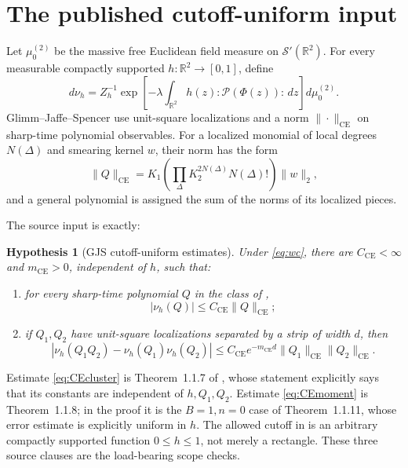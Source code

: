 \documentclass[11pt,a4paper]{article}
\newtheorem{hypothesis}[theorem]{Hypothesis}
\theoremstyle{remark}
\newcommand{\R}{\mathbb R}
\newcommand{\CE}{\mathrm{CE}}
\begin{document}
\section{The published cutoff-uniform input}

Let $\mu_0^{(2)}$ be the massive free Euclidean field measure on $\mathcal S'(\R^2)$.
For every measurable compactly supported $h:\R^2\to[0,1]$, define
\[
 d\nu_h=Z_h^{-1}\exp\left[-\lambda\int_{\R^2}
 h(z):\mathscr P(\Phi(z)):\,dz\right]d\mu_0^{(2)}.
\]
Glimm--Jaffe--Spencer use unit-square localizations and a norm
$\|\cdot\|_{\CE}$ on sharp-time polynomial observables.  For a localized monomial of local
degrees $N(\Delta)$ and smearing kernel $w$, their norm has the form
\begin{equation}\label{eq:CEnorm}
 \|Q\|_{\CE}=K_1
 \left(\prod_\Delta K_2^{2N(\Delta)}N(\Delta)!\right)\|w\|_2,       \tag{2.1}
\end{equation}
and a general polynomial is assigned the sum of the norms of its localized pieces.

The source input is exactly:

\begin{hypothesis}[GJS cutoff-uniform estimates]\label{hyp:CE}
Under \eqref{eq:wc}, there are $C_{\CE}<\infty$ and $m_{\CE}>0$, independent of
$h$, such that:
\begin{enumerate}
\item for every sharp-time polynomial $Q$ in the class of
\cite[(1.1.5)--(1.1.9)]{GJS},
\begin{equation}\label{eq:CEmoment}
 |\nu_h(Q)|\le C_{\CE}\|Q\|_{\CE};                                \tag{CE1}
\end{equation}
\item if $Q_1,Q_2$ have unit-square localizations separated by a strip of width $d$, then
\begin{equation}\label{eq:CEcluster}
 |\nu_h(Q_1Q_2)-\nu_h(Q_1)\nu_h(Q_2)|
 \le C_{\CE}e^{-m_{\CE}d}\|Q_1\|_{\CE}\|Q_2\|_{\CE}.             \tag{CE2}
\end{equation}
\end{enumerate}
\end{hypothesis}

Estimate \eqref{eq:CEcluster} is Theorem~1.1.7 of \cite{GJS}, whose statement explicitly says
that its constants are independent of $h,Q_1,Q_2$.  Estimate \eqref{eq:CEmoment} is
Theorem~1.1.8; in the proof it is the $B=1,n=0$ case of Theorem~1.1.11, whose error estimate is
explicitly uniform in $h$.  The allowed cutoff in \cite[(1.8)]{GJS} is an arbitrary compactly
supported function $0\le h\le1$, not merely a rectangle.  These three source clauses are the
load-bearing scope checks.
\end{document}
